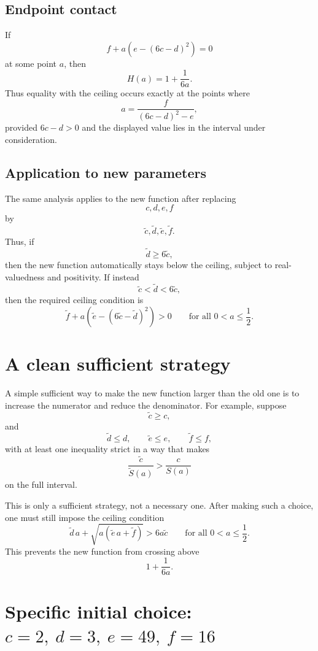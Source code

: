 \documentclass[11pt]{article}
\begin{document}
\subsection*{Endpoint contact}

If
\[
f+a\left(e-(6c-d)^2\right)=0
\]
at some point \(a\), then
\[
H(a)=1+\frac{1}{6a}.
\]
Thus equality with the ceiling occurs exactly at the points where
\[
\boxed{
a=
\frac{f}{(6c-d)^2-e},
}
\]
provided \(6c-d>0\) and the displayed value lies in the interval under consideration.

\subsection*{Application to new parameters}

The same analysis applies to the new function after replacing
\[
c,d,e,f
\]
by
\[
\widetilde c,\widetilde d,\widetilde e,\widetilde f.
\]
Thus, if
\[
\boxed{
\widetilde d\ge 6\widetilde c,
}
\]
then the new function automatically stays below the ceiling, subject to real-valuedness and positivity.
If instead
\[
\boxed{
\widetilde c<\widetilde d<6\widetilde c,
}
\]
then the required ceiling condition is
\[
\boxed{
\widetilde f
+
a\left(\widetilde e-(6\widetilde c-\widetilde d)^2\right)>0
\qquad
\text{for all }0<a\le\frac12.
}
\]

\section{A clean sufficient strategy}

A simple sufficient way to make the new function larger than the old one is to increase the numerator and reduce the denominator.
For example, suppose
\[
\boxed{
\widetilde c\ge c,
}
\]
and
\[
\boxed{
\widetilde d\le d,\qquad
\widetilde e\le e,\qquad
\widetilde f\le f,
}
\]
with at least one inequality strict in a way that makes
\[
\frac{\widetilde c}{\widetilde S(a)}
>
\frac{c}{S(a)}
\]
on the full interval.

This is only a sufficient strategy, not a necessary one.
After making such a choice, one must still impose the ceiling condition
\[
\boxed{
\widetilde d\,a+\sqrt{a(\widetilde e\,a+\widetilde f)}
>
6a\widetilde c
\qquad
\text{for all }0<a\le\frac12.
}
\]
This prevents the new function from crossing above
\[
1+\frac{1}{6a}.
\]

\section{Specific initial choice: \(c=2,\ d=3,\ e=49,\ f=16\)}
\end{document}
